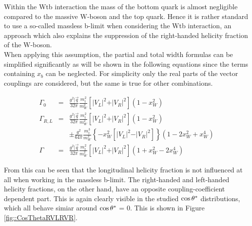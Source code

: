 Within the Wtb interaction the mass of the bottom quark is almost negligible compared to the massive W-boson and the top quark. Hence it is rather standard to use a so-called massless b-limit when considering the Wtb interaction, an approach which also explains the suppression of the right-handed helicity fraction of the W-boson.\\
When applying this assumption, the partial and total width formulas can be simplified significantly as will be shown in the following equations since the terms containing $x_{b}$ can be neglected. For simplicity only the real parts of the vector couplings are considered, but the same is true for other combinations.

\begin{eqnarray}
 \Gamma_{0}   & = & \frac{g^{2} \vert \vec{q}}{32 \pi} \frac{m_{t}^{2}}{m_{W}^{2}} \left[ \vert V_{L} \vert^{2} + \vert V_{R} \vert^{2} \right] (1 - x_{W}^{2} ) \\
 \Gamma_{R,L} & = & \frac{g^{2} \vert \vec{q}}{32 \pi} \frac{m_{t}^{2}}{m_{W}^{2}} \left[ \vert V_{L} \vert^{2} + \vert V_{R} \vert^{2} \right] (1 - x_{W}^{2})  \nonumber \\
              &   & \pm \frac{g^{2}}{64 \pi} \frac{m_{t}^{3}}{m_{W}^{2}} \left\lbrace -x_{W}^{2} \left[ \vert V_{L} \vert^{2} - \vert V_{R} \vert^{2}  \right] \right\rbrace (1-2x_{W}^{2} + x_{W}^{4})\\
 \Gamma       & = & \frac{g^{2} \vert \vec{q}}{32 \pi} \frac{m_{t}^{2}}{m_{W}^{2}} \left[ \vert V_{L} \vert^{2} + \vert V_{R} \vert^{2} \right] (1 + x_{W}^{2} - 2 x_{W}^{4})
\end{eqnarray}

From this can be seen that the longitudinal helicity fraction is not influenced at all when working in the massless b-limit. The right-handed and left-handed helicity fractions, on the other hand, have an opposite coupling-coefficient dependent part. This is again clearly visible in the studied $\cos \theta^{*}$ distributions, which all behave simiar around $\cos \theta^{*}$ = $0$. This is shown in Figure \ref{fig::CosThetaRVLRVR}.

